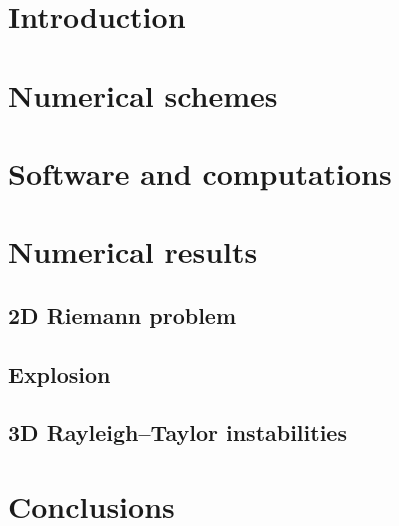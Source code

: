 





\section{Introduction}
  
  
\section{Numerical schemes}
  

\section{Software and computations}
  
 \section{Numerical results}
 
 \subsection{2D Riemann problem}
 
  \subsection{Explosion}
 
  \subsection{3D Rayleigh–Taylor instabilities}
  
	\section{Conclusions}
	
  
 
  